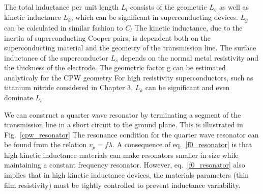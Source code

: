 The total inductance per unit length $L_l$ consists of the geometric $L_g$ as well as kinetic inductance $L_k$,
which can be significant in superconducting devices.
$L_g$ can be calculated in similar fashion to $C_l$ \cite{GaoThesis}
The kinetic inductance, due to the inertia of superconducting Cooper pairs, is dependent both on the superconducting material and the geometry of the transmission line.
The surface inductance of the superconductor $L_s$ depends on the normal metal resistivity and the thickness of the electrode. \cite{KherThesis}
The geometric factor g can be estimated analyticaly for the CPW geometry \cite{RamiThesis, GaoThesis}
For high resistivity superconductors, such as titanium nitride considered in Chapter 3, $L_k$ can be significant and even dominate $L_l$.


We can construct a quarter wave resonator by terminating a segment of the transmission line in a short circuit to the ground plane.
This is illustrated in Fig.~\ref{cpw_resonator}
The resonance condition for the quarter wave resonator can be found from the relation $v_p = f \lambda$.
A consequence of eq.~\ref{f0_resonator} is that high kinetic inductance materials can make resonators smaller in size while maintaining a constant frequency resonator.
However, eq.~\ref{f0_resonator} also implies that in high kinetic inductance devices,
the materials parameters (thin film resistivity) must be tightly controlled to prevent inductance variability.

